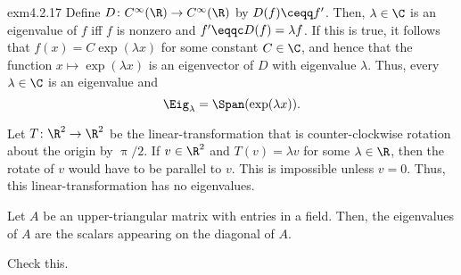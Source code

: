 \begin{exm}{}{exm4.2.17}
	Define $D\colon C^{\infty}(\R )\rightarrow C^{\infty}(\R )$ by $D(f)\ceqq f'$.  Then, $\lambda \in \C$ is an eigenvalue of $f$ iff $f$ is nonzero and $f'\eqqc D(f)=\lambda f$.  If this is true, it follows that $f(x)=C\exp (\lambda x)$ for some constant $C\in \C$, and hence that the function $x\mapsto \exp (\lambda x)$ is an eigenvector of $D$ with eigenvalue $\lambda$.  Thus, every $\lambda \in \C$ is an eigenvalue and
	\begin{equation}
		\Eig _{\lambda}=\Span (\exp (\lambda x)).
	\end{equation}
\end{exm}
\begin{exm}{}{}
	Let $T\colon \R ^2\rightarrow \R ^2$ be the linear-transformation that is counter-clockwise rotation about the origin by $\uppi /2$.  If $v\in \R ^2$ and $T(v)=\lambda v$ for some $\lambda \in \R$, then the rotate of $v$ would have to be parallel to $v$.  This is impossible unless $v=0$.  Thus, this linear-transformation has no eigenvalues.
\end{exm}
\begin{exm}{}{}
	Let $A$ be an upper-triangular matrix with entries in a field.  Then, the eigenvalues of $A$ are the scalars appearing on the diagonal of $A$.
	\begin{exr}[breakable=false]{}{}
		Check this.
	\end{exr}
\end{exm}
